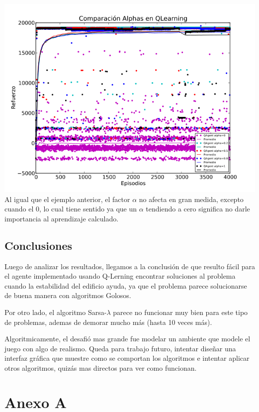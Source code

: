 \documentclass[11pt, a4paper]{article}
\newcommand{\slambda}{Sarsa-$\lambda$ }
\begin{document}
\includegraphics[scale=0.6]{Graficos/alphasQ}
Al igual que el ejemplo anterior, el factor $\alpha$  no afecta en gran medida, excepto cuando el 0, lo cual tiene sentido ya que un $\alpha$ tendiendo a cero significa no darle importancia al aprendizaje calculado. 

\subsection{Conclusiones}
Luego de analizar los resultados, llegamos a la conclusi\'on de que resulto f\'acil para el agente implementado usando Q-Lerning encontrar soluciones al problema cuando la estabilidad del edificio ayuda, ya que el problema parece solucionarse de buena manera con algoritmos Golosos. 

Por otro lado, el algoritmo \slambda parece no funcionar muy bien para este tipo de problemas, ademas de demorar mucho m\'as (hasta 10 veces m\'as). 

Algoritmicamente, el desafi\'o mas grande fue modelar un ambiente que modele el juego con algo de realismo. Queda para trabajo futuro, intentar diseñar una interfaz gr\'afica que muestre como se comportan los algoritmos e intentar aplicar otros algoritmos, quiz\'as mas directos para ver como funcionan. 



\newpage

\section{Anexo A}
\end{document}
